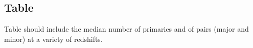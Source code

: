\documentclass[twocolumn]{aastex631}
\newcommand{\kc}[1]{\textcolor{yellow}{\textbf{kc: #1}} }
\begin{document}
\subsection{Table}
Table should include the median number of primaries and of pairs (major and minor) at a variety of redshifts. 












\end{document}
